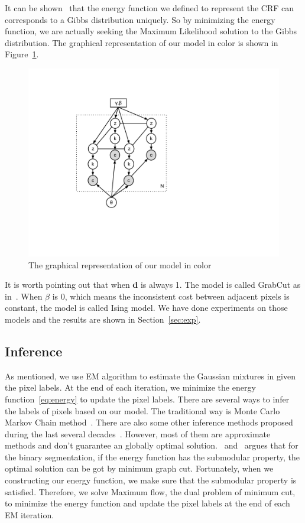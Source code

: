 \documentclass{article} %
\begin{document}
It can be shown~\citep{Geman1984Stochastic, Li2001Markov} that the
energy function we defined to represent the CRF can corresponds to a
Gibbs distribution uniquely. So by minimizing the energy function, we
are actually seeking the Maximum Likelihood solution to the Gibbs
distribution. The graphical representation of our model in color is
shown in Figure~\ref{fig:mrf_model}.

\begin{figure}[h]
\begin{center}
\includegraphics[height=0.5\linewidth]{./fig/mrf_model.pdf}
\end{center}
\caption{The graphical representation of our model in color}
\label{fig:mrf_model}
\end{figure}

It is worth pointing out that when \textbf{d} is always 1. The model is
called GrabCut as in~\citep{Rother2004GrabCut}. When $\beta$ is 0,
which means the inconsistent cost between adjacent pixels is constant,
the model is called Ising model. We have done experiments on those
models and the results are shown in Section~\ref{sec:exp}.

\subsection{Inference}
As mentioned, we use EM algorithm to estimate the Gaussian mixtures in
given the pixel labels. At the end of each iteration, we minimize the
energy function~\eqref{eq:energy} to update the pixel labels. There
are several ways to infer the labels of pixels based on our model. The
traditional way is Monte Carlo Markov Chain
method~\citep{Bishop2006Pattern}. There are also some other inference
methods proposed during the last several
decades~\citep{Szeliski2008Comparative}. However, most of them are
approximate methods and don't guarantee an globally optimal
solution.~\citet{Boykov2001Fast} and~\citet{Boykov2006} argues that for the binary
segmentation, if the energy function has the submodular property, the
optimal solution can be got by minimum graph cut. Fortunately, when we
constructing our energy function, we make sure that the submodular
property is satisfied. Therefore, we solve Maximum flow, the dual
problem of minimum cut, to minimize the energy function and update the
pixel labels at the end of each EM iteration.
\end{document}
